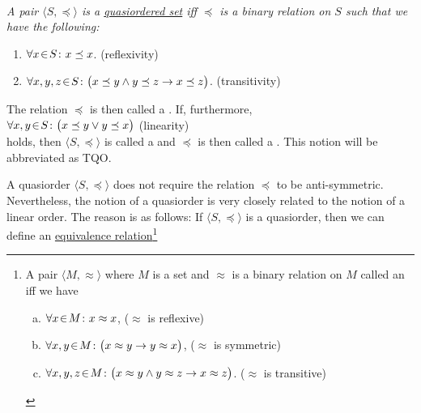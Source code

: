 \begin{Definition}[Quasiorder]  \hspace*{\fill} \\
{\em
  A pair $\langle S, \preceq\rangle$ is a \href{https://en.wikipedia.org/wiki/Preorder}{quasiordered set}   iff $\preceq$ is a 
  binary relation on $S$ such that we have the following:
  \begin{enumerate}
  \item $\forall x \!\in\! S\colon x \preceq x$. \hspace*{\fill} (reflexivity)
  \item $\forall x, y, z \!\in\! S \colon \bigl(x \preceq y \wedge y \preceq z \rightarrow x \preceq z\bigr)$. 
         \hspace*{\fill} (transitivity)
  \end{enumerate}
  The relation $\preceq$ is then called a .  If, furthermore,
  \\[0.2cm]
  \hspace*{1.3cm}
  $\forall x, y \!\in\! S \colon \bigl(x \preceq y \vee y \preceq x\bigr)$ \hspace*{\fill} (linearity) 
  \\[0.2cm]
  holds, then $\langle S, \preceq \rangle$ is called a  and $\preceq$ is then
  called a .  This notion will be abbreviated as \textsc{TQO}.
}
\end{Definition}
A quasiorder $\langle S, \preceq \rangle$ does not require the relation $\preceq$ to be
anti-symmetric.  Nevertheless, the notion of a quasiorder is very closely related to the notion of a
linear order.  The reason is as follows:  If $\langle S, \preceq \rangle$ is a quasiorder, then we can define an
\href{https://en.wikipedia.org/wiki/Equivalence_relation}{equivalence relation}\footnote{
  A pair $\langle M, \approx \rangle$ where $M$ is a set and $\approx$ is a binary relation on $M$ called an
   iff we have
  \begin{enumerate}[(a)]
  \item $\forall x \!\in\! M \colon x \approx x$,                      \hspace*{\fill} ($\approx$ is reflexive)
  \item $\forall x, y \!\in\! M \colon \bigl(x \approx y \rightarrow y \approx x\bigr)$,
        \hspace*{\fill} ($\approx$ is symmetric)
  \item $\forall x, y, z \!\in\! M \colon \bigl(x \approx y \wedge y \approx z \rightarrow x \approx z\bigr)$.
        \hspace*{\fill} ($\approx$ is transitive)
\end{enumerate}
}
